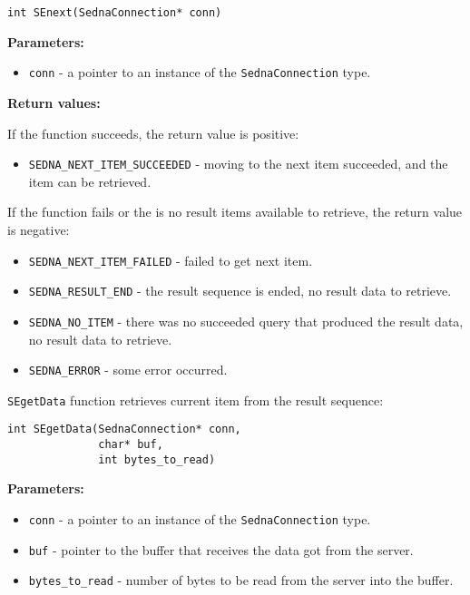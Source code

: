 \documentclass[a4paper,12pt]{article}
\newenvironment{citemize}
{\begin{itemize}
  \setlength{\itemsep}{0pt}
  \setlength{\parskip}{0pt}
  \setlength{\parsep}{0pt}}
{\end{itemize}}
\begin{document}
\begin{verbatim}
int SEnext(SednaConnection* conn)
\end{verbatim}

\noindent
\textbf{Parameters:}

\begin{citemize}
\item\verb!conn! - a pointer to an instance of the \verb!SednaConnection! type.
\end{citemize}

\noindent
\textbf{Return values:}

\medskip

\noindent
If the function succeeds, the return value is positive:

\begin{citemize}
\item\verb!SEDNA_NEXT_ITEM_SUCCEEDED! - moving to the next item succeeded, and
the item can be retrieved.
\end{citemize}

\noindent
If the function fails or the is no result items available to retrieve, the
return value is negative:

\begin{citemize}
\item\verb!SEDNA_NEXT_ITEM_FAILED! - failed to get next item.
\item\verb!SEDNA_RESULT_END! - the result sequence is ended, no result data to
retrieve.
\item\verb!SEDNA_NO_ITEM! - there was no succeeded query that produced the
result data, no result data to retrieve.
\item\verb!SEDNA_ERROR! - some error occurred.
\end{citemize}

\verb!SEgetData! function retrieves current item from the result sequence:

\begin{verbatim}
int SEgetData(SednaConnection* conn, 
              char* buf, 
              int bytes_to_read)
\end{verbatim}

\noindent
\textbf{Parameters:}

\begin{citemize}
\item\verb!conn! - a pointer to an instance of the \verb!SednaConnection! type.
\item\verb!buf! - pointer to the buffer that receives the data got from the
server.
\item\verb!bytes_to_read! - number of bytes to be read from the server into the
buffer.
\end{citemize}
\end{document}
